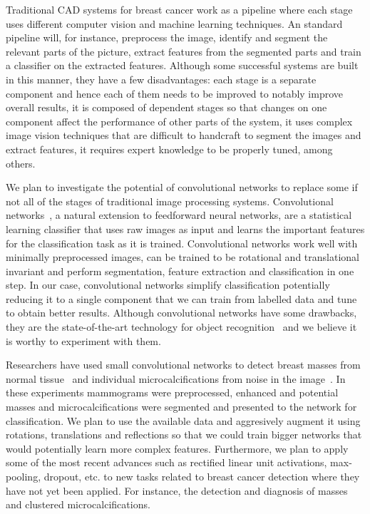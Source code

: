 Traditional CAD systems for breast cancer work as a pipeline where each stage uses different computer vision and machine learning techniques. An standard pipeline will, for instance, preprocess the image, identify and segment the relevant parts of the picture, extract features from the segmented parts and train a classifier on the extracted features. Although some successful systems are built in this manner, they have a few disadvantages: each stage is a separate component and hence each of them needs to be improved to notably improve overall results, it is composed of dependent stages so that changes on one component affect the performance of other parts of the system, it uses complex image vision techniques that are difficult to handcraft to segment the images and extract features, it requires expert knowledge to be properly tuned, among others.

We plan to investigate the potential of convolutional networks to replace some if not all of the stages of traditional image processing systems. Convolutional networks~\cite{Fukushima1980,LeCun1998}, a natural extension to feedforward neural networks, are a statistical learning classifier that uses raw images as input and learns the important features for the classification task as it is trained. Convolutional networks work well with minimally preprocessed images, can be trained to be rotational and translational invariant and perform segmentation, feature extraction and classification in one step. In our case, convolutional networks simplify classification potentially reducing it to a single component that we can train from labelled data and tune to obtain better results. Although convolutional networks have some drawbacks, they are the state-of-the-art technology for object recognition~\cite{Russakovsky2014} and we believe it is worthy to experiment with them.

Researchers have used small convolutional networks to detect breast masses from normal tissue~\cite{Sahiner1996} and individual microcalcifications from noise in the image~\cite{Lo1995, Ge2007}. In these experiments mammograms were preprocessed, enhanced and potential masses and microcalcifications were segmented and presented to the network for classification. We plan to use the available data and aggresively augment it using rotations, translations and reflections so that we could train bigger networks that would potentially learn more complex features. Furthermore, we plan to apply some of the most recent advances such as rectified linear unit activations, max-pooling, dropout, etc. to new tasks related to breast cancer detection where they have not yet been applied. For instance, the detection and diagnosis of masses and clustered microcalcifications.

